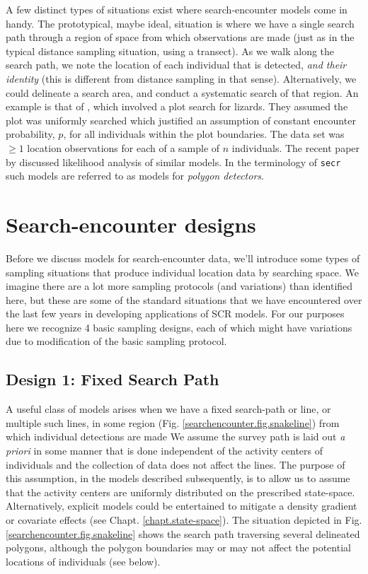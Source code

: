 A few distinct types of situations exist where search-encounter models come in
handy. The prototypical, maybe ideal, situation
\citet{royle_etal:2011mee} is where we have a single search path
through a region of space from which observations are made (just as in
the typical distance sampling situation, using a transect). As we walk
along the search path, we note the location of each individual that is
detected, {\it and their identity} (this is different from distance
sampling in that sense).  Alternatively, we could delineate a search
area, and conduct a systematic search of that region. An example is
that of \citet{royle_young:2008}, which involved a plot search for
lizards. They assumed the plot was uniformly searched which justified
an assumption of constant encounter probability, $p$, for all
individuals within the plot boundaries.  The data set was $\ge 1$
location observations for each of a sample of $n$ individuals.  The
recent paper by \citet{efford:2011} discussed likelihood analysis of
similar models. In the terminology of \mbox{\tt secr} such models are
referred to as models for {\it polygon detectors}.




\section{Search-encounter designs}

Before we discuss models for search-encounter data, we'll introduce some
types of sampling situations that produce individual location data
by searching space.  We imagine there are a lot more sampling protocols
(and variations) than identified here, but these are some of the
standard situations that we have encountered over the last few years
in developing applications of SCR models.  For our purposes here we
recognize 4 basic sampling designs, %
each of which might have
variations due to modification of the basic sampling protocol.


\subsection{Design 1: Fixed Search Path}
\label{searchencounter.sec.fixedpath}

A useful class of models arises when we have a fixed search-path
or line, or multiple such lines, in some region
(Fig. \ref{searchencounter.fig.snakeline}) from which individual
detections are made We assume the survey path is laid out {\it a
  priori} in some manner that is done independent of the activity
centers of individuals and the collection of data does not affect the
lines.  The purpose of this assumption, in the models described
subsequently, is to allow us to assume that the activity centers are
uniformly distributed on the prescribed state-space. Alternatively,
explicit models could be entertained to mitigate a density gradient or
covariate effects (see Chapt. \ref{chapt.state-space}). The situation
depicted in Fig. \ref{searchencounter.fig.snakeline} shows the search
path traversing several delineated polygons, although the polygon
boundaries may or may not affect the potential locations of
individuals (see below).

